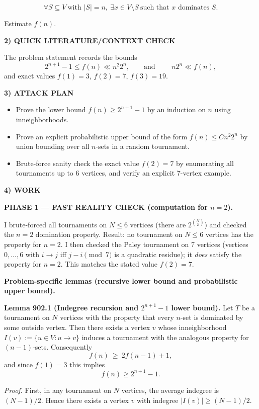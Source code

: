 \[ \forall S\subseteq V\ \text{with }|S|=n,\ \exists x\in V\setminus S\ \text{such that }x\text{ dominates }S. \]

Estimate $f(n)$.

\medskip
\noindent\textbf{2) QUICK LITERATURE/CONTEXT CHECK}

The problem statement records the bounds
\[2^{n+1}-1\le f(n)\ll n^2 2^n,\qquad\text{and }\qquad n2^n\ll f(n),
\]
and exact values $f(1)=3$, $f(2)=7$, $f(3)=19$.

\medskip
\noindent\textbf{3) ATTACK PLAN}

\begin{itemize}
\item Prove the lower bound $f(n)\ge 2^{n+1}-1$ by an induction on $n$ using
inneighborhoods.
\item Prove an explicit probabilistic upper bound of the form
$f(n)\le C n^2 2^n$ by union bounding over all $n$-sets in a random tournament.
\item Brute-force sanity check the exact value $f(2)=7$ by enumerating all
tournaments up to 6 vertices, and verify an explicit 7-vertex example.
\end{itemize}

\medskip
\noindent\textbf{4) WORK}

\textbf{PHASE 1 — FAST REALITY CHECK (computation for $n=2$).}

I brute-forced all tournaments on $N\le 6$ vertices (there are $2^{\binom{N}{2}}$)
and checked the $n=2$ domination property.
Result: no tournament on $N\le 6$ vertices has the property for $n=2$.
I then checked the Paley tournament on 7 vertices (vertices $0,\dots,6$ with
$i\to j$ iff $j-i\pmod 7$ is a quadratic residue); it \emph{does} satisfy the
property for $n=2$.
This matches the stated value $f(2)=7$.

\medskip
\textbf{Problem-specific lemmas (recursive lower bound and probabilistic upper bound).}

\medskip
\noindent\textbf{Lemma 902.1 (Indegree recursion and $2^{n+1}-1$ lower bound).}
Let $T$ be a tournament on $N$ vertices with the property that every $n$-set is
dominated by some outside vertex. Then there exists a vertex $v$ whose
inneighborhood $I(v):=\{u\in V: u\to v\}$ induces a tournament with the analogous
property for $(n-1)$-sets.
Consequently
\[ f(n)\ \ge\ 2 f(n-1)+1, \]
and since $f(1)=3$ this implies
\[ f(n)\ge 2^{n+1}-1. \]

\emph{Proof.}
First, in any tournament on $N$ vertices, the average indegree is $(N-1)/2$.
Hence there exists a vertex $v$ with indegree
$|I(v)|\ge (N-1)/2$.


